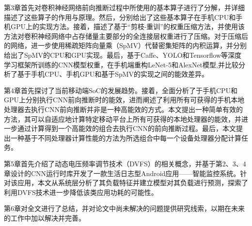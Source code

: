 第3章首先对卷积神经网络前向推断过程中所使用的基本算子进行了分解，并详细描述了这些算子的作用与原理。然后，分别给出了这些基本算子在手机CPU和手机GPU上的实现方法。接着，描述了基于“剪枝-重训”的权重压缩方法，并使用该方法对卷积神经网络中占存储量主要部分的全连接层权重进行了压缩。对于压缩后的网络，进一步使用稀疏矩阵向量乘（SpMV）代替密集矩阵的内积运算，并分别给出了SpMV的CPU和GPU实现。最后，基于Caffe、YOLO和Tensorflow等深度学习框架所训练的CNN模型权重，在手机端重构LeNet-5\cite{lecun1998gradient}和AlexNet\cite{krizhevsky2012imagenet}模型,并比较分析了基于手机CPU、手机GPU和基于SpMV的实现之间的能效差异。

第4章首先探讨了当前移动端SoC的发展趋势。接着，全面分析了于手机CPU和GPU上分别执行CNN前向推断时的能效，进而阐述了利用所有可获得的手机本地处理器去执行CNN前向推断并非是一种高能效的方式。本文提出一种简单有效的方法，其可以自适应地计算特定移动平台上所有可获得的本地处理器的能效，并进一步通过计算得到一个高能效的组合去执行CNN的前向推断过程。最后，本文提出一种基于不同处理器计算性能的方法为所选组合中每一个设备处理器分配计算任务。

第5章首先介绍了动态电压频率调节技术（DVFS）的相关概念，并基于第2、3、4章设计的CNN运行时库开发了一款生活日志型Android应用——智能监控系统。针对该应用，本文从系统层分析了其负载特征并建立模型对其负载进行预测，探索了利用DVFS技术进一步降低该类应用功耗的可能性。

第6章对全文进行了总结，并对论文中尚未解决的问题提供研究线索，以期在未来的工作中加以解决并完善。